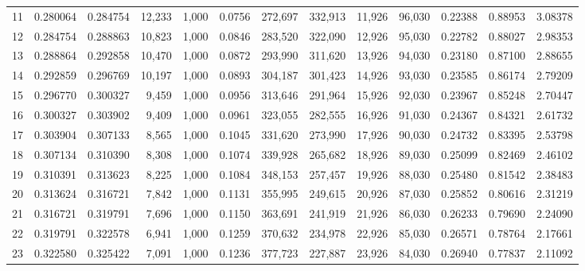 \begin{tabular}{rrrrrrrrrrrrr}
11  &  0.280064 &  0.284754 &  12,233 &  1,000 &                                     0.0756 &  272,697 &  332,913 &   11,926 &   96,030 &  0.22388 &  0.88953 &  3.08378 \\
12  &  0.284754 &  0.288863 &  10,823 &  1,000 &                                     0.0846 &  283,520 &  322,090 &   12,926 &   95,030 &  0.22782 &  0.88027 &  2.98353 \\
13  &  0.288864 &  0.292858 &  10,470 &  1,000 &                                     0.0872 &  293,990 &  311,620 &   13,926 &   94,030 &  0.23180 &  0.87100 &  2.88655 \\
14  &  0.292859 &  0.296769 &  10,197 &  1,000 &                                     0.0893 &  304,187 &  301,423 &   14,926 &   93,030 &  0.23585 &  0.86174 &  2.79209 \\
15  &  0.296770 &  0.300327 &   9,459 &  1,000 &                                     0.0956 &  313,646 &  291,964 &   15,926 &   92,030 &  0.23967 &  0.85248 &  2.70447 \\
16  &  0.300327 &  0.303902 &   9,409 &  1,000 &                                     0.0961 &  323,055 &  282,555 &   16,926 &   91,030 &  0.24367 &  0.84321 &  2.61732 \\
17  &  0.303904 &  0.307133 &   8,565 &  1,000 &                                     0.1045 &  331,620 &  273,990 &   17,926 &   90,030 &  0.24732 &  0.83395 &  2.53798 \\
18  &  0.307134 &  0.310390 &   8,308 &  1,000 &                                     0.1074 &  339,928 &  265,682 &   18,926 &   89,030 &  0.25099 &  0.82469 &  2.46102 \\
19  &  0.310391 &  0.313623 &   8,225 &  1,000 &                                     0.1084 &  348,153 &  257,457 &   19,926 &   88,030 &  0.25480 &  0.81542 &  2.38483 \\
20  &  0.313624 &  0.316721 &   7,842 &  1,000 &                                     0.1131 &  355,995 &  249,615 &   20,926 &   87,030 &  0.25852 &  0.80616 &  2.31219 \\
21  &  0.316721 &  0.319791 &   7,696 &  1,000 &                                     0.1150 &  363,691 &  241,919 &   21,926 &   86,030 &  0.26233 &  0.79690 &  2.24090 \\
22  &  0.319791 &  0.322578 &   6,941 &  1,000 &                                     0.1259 &  370,632 &  234,978 &   22,926 &   85,030 &  0.26571 &  0.78764 &  2.17661 \\
23  &  0.322580 &  0.325422 &   7,091 &  1,000 &                                     0.1236 &  377,723 &  227,887 &   23,926 &   84,030 &  0.26940 &  0.77837 &  2.11092 \\

\end{tabular}
